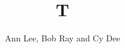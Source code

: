 \documentclass{article}
\begin{document}
\title{T}
\author{Ann Lee, Bob Ray and Cy Dee}
\maketitle
\end{document}
